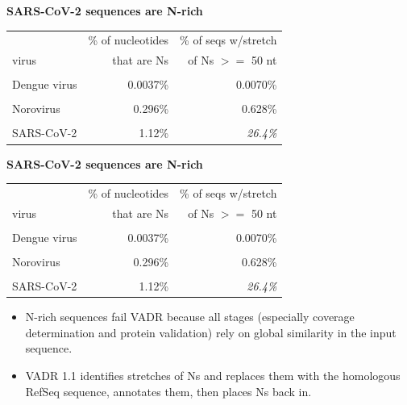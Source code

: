 \documentclass[landscape]{slides}
\begin{document}
\begin{slide}
\begin{center}
\textbf{SARS-CoV-2 sequences are N-rich}
\end{center}

\begin{center}
\begin{tabular}{lrr}
            & \% of nucleotides & \% of seqs w/stretch \\
  virus     & that are Ns       & of Ns $>=$ 50 nt     \\ \hline
& & \\
Dengue virus  & 0.0037\%        & 0.0070\%             \\
& & \\                    
Norovirus     & 0.296\%         & 0.628\%             \\
& & \\                    
SARS-CoV-2    & 1.12\%          & \emph{26.4\%}       \\
\end{tabular}
\end{center}
\vfill

\vfill
\end{slide}
\begin{slide}
\begin{center}
\textbf{SARS-CoV-2 sequences are N-rich}
\end{center}

\begin{center}
\begin{tabular}{lrr}
            & \% of nucleotides & \% of seqs w/stretch \\
  virus     & that are Ns       & of Ns $>=$ 50 nt     \\ \hline
& & \\
Dengue virus  & 0.0037\%        & 0.0070\%             \\
& & \\                    
Norovirus     & 0.296\%         & 0.628\%             \\
& & \\                    
SARS-CoV-2    & 1.12\%          & \emph{26.4\%}       \\
\end{tabular}
\end{center}
\vfill

\begin{itemize}
\item
  N-rich sequences fail VADR because all stages
  (especially coverage determination and protein validation) rely on global
  similarity in the input sequence.
\item
  VADR 1.1 identifies stretches of Ns and replaces them with the
  homologous RefSeq sequence, annotates them, then places Ns back in.
\end{itemize}

\vfill
\end{slide}
\end{document}
